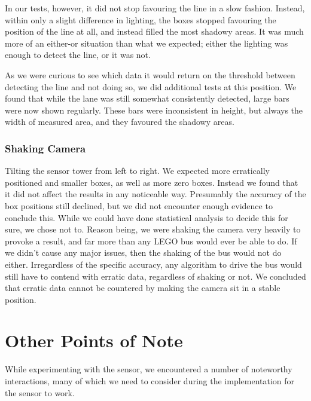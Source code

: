 In our tests, however, it did not stop favouring the line in a slow fashion. Instead, within only a slight difference in lighting, the boxes stopped favouring the position of the line at all, and instead filled the most shadowy areas. It was much more of an either-or situation than what we expected; either the lighting was enough to detect the line, or it was not. 

As we were curious to see which data it would return on the threshold between detecting the line and not doing so, we did additional tests at this position. We found that while the lane was still somewhat consistently detected, large bars were now shown regularly. These bars were inconsistent in height, but always the width of measured area, and they favoured the shadowy areas. 

\todo{}



\subsubsection{Shaking Camera}
Tilting the sensor tower from left to right. 
We expected more erratically positioned and smaller boxes, as well as more zero boxes.
Instead we found that it did not affect the results in any noticeable way. Presumably the accuracy of the box positions still declined, but we did not encounter enough evidence to conclude this. While we could have done statistical analysis to decide this for sure, we chose not to. 
Reason being, we were shaking the camera very heavily to provoke a result, and far more than any LEGO bus would ever be able to do. If we didn't cause any major issues, then the shaking of the bus would not do either. Irregardless of the specific accuracy, any algorithm to drive the bus would still have to contend with erratic data, regardless of shaking or not. We concluded that erratic data cannot be countered by making the camera sit in a stable position.


\section{Other Points of Note} \label{noteworthyCam}
While experimenting with the sensor, we encountered a number of noteworthy interactions, many of which we need to consider during the implementation for the sensor to work. 



